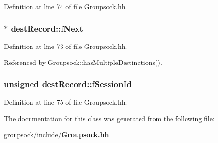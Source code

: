 Definition at line 74 of file Groupsock.\+hh.

\subsubsection[{f\+Next}]{$\ast$ dest\+Record\+::f\+Next}\label{classdestRecord_a0724e80bd00b6dec5cba1dc420e8e344}


Definition at line 73 of file Groupsock.\+hh.



Referenced by Groupsock\+::has\+Multiple\+Destinations().

\subsubsection[{f\+Session\+Id}]{\setlength{\rightskip}{0pt plus 5cm}unsigned dest\+Record\+::f\+Session\+Id}\label{classdestRecord_aa50856774230e5f125cab6b9c7dec365}


Definition at line 75 of file Groupsock.\+hh.



The documentation for this class was generated from the following file\+:\begin{DoxyCompactItemize}
\item 
groupsock/include/{\bf Groupsock.\+hh}\end{DoxyCompactItemize}
